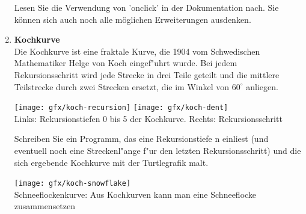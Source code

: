 \begin{enumerate}[1.]
Lesen Sie die Verwendung von 'onclick' in der Dokumentation nach.
Sie können sich
auch noch alle möglichen Erweiterungen ausdenken.




\item \textbf{Kochkurve} \\
Die Kochkurve ist eine fraktale Kurve, die 1904 vom Schwedischen
Mathematiker Helge von Koch eingef"uhrt wurde. Bei jedem
Rekursionsschritt wird jede Strecke in drei Teile geteilt und die
mittlere Teilstrecke durch zwei Strecken ersetzt, die im Winkel von
$60^{\circ}$ anliegen.

\begin{center}
  \texttt{[image: gfx/koch-recursion]}\hfill%
  \texttt{[image: gfx/koch-dent]}\\
  {Links: Rekursionstiefen 0 bis 5 der Kochkurve. Rechts: Rekursionsschritt}
\end{center}

Schreiben Sie ein Programm, das eine Rekursionstiefe n einliest (und
eventuell noch eine Streckenl"ange f"ur den letzten Rekursionsschritt)
und die sich ergebende Kochkurve mit der Turtlegrafik malt.


\begin{center}
  \texttt{[image: gfx/koch-snowflake]}\\
  {\glqq Schneeflockenkurve\grqq: Aus Kochkurven kann man eine
    Schneeflocke zusammensetzen}
\end{center}


\end{enumerate}
